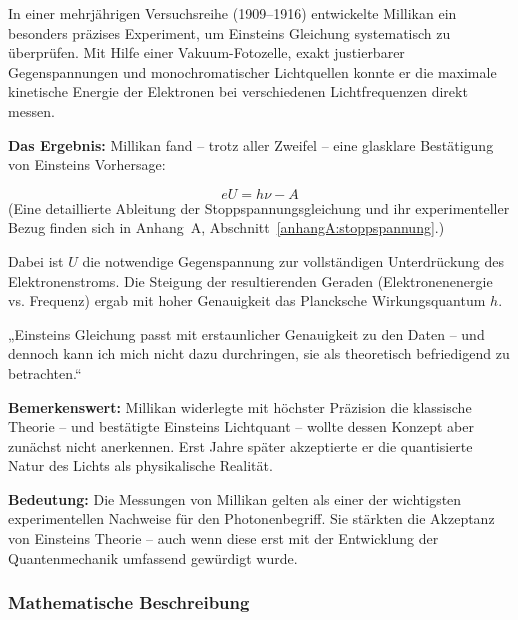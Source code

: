 In einer mehrjährigen Versuchsreihe (1909–1916) entwickelte Millikan ein besonders präzises Experiment, um Einsteins Gleichung systematisch zu überprüfen. Mit Hilfe einer Vakuum-Fotozelle, exakt justierbarer Gegenspannungen und monochromatischer Lichtquellen konnte er die maximale kinetische Energie der Elektronen bei verschiedenen Lichtfrequenzen direkt messen.

\textbf{Das Ergebnis:} Millikan fand – trotz aller Zweifel – eine glasklare Bestätigung von Einsteins Vorhersage:

\[
e U = h \nu - A
\]
(Eine detaillierte Ableitung der Stoppspannungsgleichung und ihr experimenteller Bezug finden sich in Anhang~A, Abschnitt~\ref{anhangA:stoppspannung}.)

Dabei ist \( U \) die notwendige Gegenspannung zur vollständigen Unterdrückung des Elektronenstroms. Die Steigung der resultierenden Geraden (Elektronenenergie vs. Frequenz) ergab mit hoher Genauigkeit das Plancksche Wirkungsquantum \( h \).

\medskip
\begin{tcolorbox}[physikbox, title=Robert A. Millikan (1916)\textit{ \cite{millikan1916}} ]
	\label{box:einsteins gleichung passt}
	\small
	„Einsteins Gleichung passt mit erstaunlicher Genauigkeit zu den Daten – und dennoch kann ich mich nicht dazu durchringen, sie als theoretisch befriedigend zu betrachten.“
\end{tcolorbox}
\medskip
\textbf{Bemerkenswert:} Millikan widerlegte mit höchster Präzision die klassische Theorie – und bestätigte Einsteins Lichtquant – wollte dessen Konzept aber zunächst nicht anerkennen. Erst Jahre später akzeptierte er die quantisierte Natur des Lichts als physikalische Realität.

\textbf{Bedeutung:} Die Messungen von Millikan gelten als einer der wichtigsten experimentellen Nachweise für den Photonenbegriff. Sie stärkten die Akzeptanz von Einsteins Theorie – auch wenn diese erst mit der Entwicklung der Quantenmechanik umfassend gewürdigt wurde.

\subsubsection{Mathematische Beschreibung}

